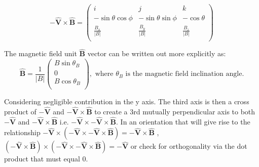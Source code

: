 \documentclass[11pt]{article}
\begin{document}
\begin{equation}
    \mathbf{-\hat{V}}\times \mathbf{\hat{B}} = \left(
    \begin{array}{ccc}
    i & j & k \\ 	
   - \sin\theta \cos\phi & -\sin\theta \sin\phi  & -\cos\theta \\ 
    \frac{ B_x}{\left|B\right|}& \frac{ B_y}{\left|B\right|} &\frac{ B_z}{\left|B\right|}\\
\end{array} 
\right)
\end{equation}

The magnetic field unit $\mathbf{\hat{B}}$ vector can be written out more explicitly as:
\begin{equation}
   \mathbf{\hat{B}}=\frac{1}{\left|B\right|} \left(
    \begin{array}{c}
    B\sin\theta_B \\ 	
    0\\ 
    B\cos\theta_B \\
\end{array} 
\right),  \mbox{  where $\theta_B$ is the magnetic field inclination angle.}
\end{equation}

Considering negligible contribution in the y axis. The third axis is then a cross product of   $\mathbf{-\hat{V}}$ and $\mathbf{-\hat{V}}\times \mathbf{\hat{B}}$ to create a 3rd mutually perpendicular axis to both $\mathbf{-\hat{V}}$ and $\mathbf{-\hat{V}}\times \mathbf{\hat{B}}$ i.e. $\mathbf{-\hat{V}} \times\mathbf{-\hat{V}}\times \mathbf{\hat{B}}$. In an orientation that will give rise to the relationship $\mathbf{-\hat{V}} \times \left( \mathbf{-\hat{V}} \times\mathbf{-\hat{V}}\times \mathbf{\hat{B}}\right) = \mathbf{-\hat{V}}\times \mathbf{\hat{B}} $ , $\left(\mathbf{-\hat{V}}\times \mathbf{\hat{B}}\right) \times \left( \mathbf{-\hat{V}} \times\mathbf{-\hat{V}}\times \mathbf{\hat{B}}\right) = \mathbf{-\hat{V}}$ or check for orthogonality via the dot product that must equal 0.

\end{document}
